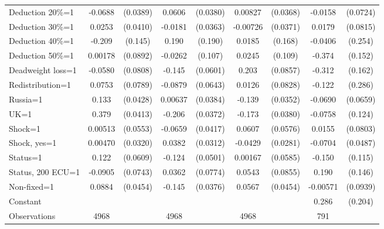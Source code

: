 \begin{tabular}{l|cccccc|cc}
Deduction 20\%=1&  -0.0688\sym{*}  & (0.0389)&   0.0606         & (0.0380)&  0.00827         & (0.0368)&  -0.0158         & (0.0724)\\
Deduction 30\%=1&   0.0253         & (0.0410)&  -0.0181         & (0.0363)& -0.00726         & (0.0371)&   0.0179         & (0.0815)\\
Deduction 40\%=1&   -0.209         &  (0.145)&    0.190         &  (0.190)&   0.0185         &  (0.168)&  -0.0406         &  (0.254)\\
Deduction 50\%=1&  0.00178         & (0.0892)&  -0.0262         &  (0.107)&   0.0245         &  (0.109)&   -0.374\sym{**} &  (0.152)\\
Deadweight loss=1&  -0.0580         & (0.0808)&   -0.145\sym{**} & (0.0601)&    0.203\sym{**} & (0.0857)&   -0.312\sym{*}  &  (0.162)\\
Redistribution=1&   0.0753         & (0.0789)&  -0.0879         & (0.0643)&   0.0126         & (0.0828)&   -0.122         &  (0.286)\\
Russia=1        &    0.133\sym{***}& (0.0428)&  0.00637         & (0.0384)&   -0.139\sym{***}& (0.0352)&  -0.0690         & (0.0659)\\
UK=1            &    0.379\sym{***}& (0.0413)&   -0.206\sym{***}& (0.0372)&   -0.173\sym{***}& (0.0380)&  -0.0758         &  (0.124)\\
Shock=1         &  0.00513         & (0.0553)&  -0.0659         & (0.0417)&   0.0607         & (0.0576)&   0.0155         & (0.0803)\\
Shock, yes=1    &  0.00470         & (0.0320)&   0.0382         & (0.0312)&  -0.0429         & (0.0281)&  -0.0704         & (0.0487)\\
Status=1        &    0.122\sym{**} & (0.0609)&   -0.124\sym{**} & (0.0501)&  0.00167         & (0.0585)&   -0.150         &  (0.115)\\
Status, 200 ECU=1&  -0.0905         & (0.0743)&   0.0362         & (0.0774)&   0.0543         & (0.0855)&    0.190         &  (0.146)\\
Non-fixed=1     &   0.0884\sym{*}  & (0.0454)&   -0.145\sym{***}& (0.0376)&   0.0567         & (0.0454)& -0.00571         & (0.0939)\\
Constant        &                  &         &                  &         &                  &         &    0.286         &  (0.204)\\
\hline
Observations    &     4968         &         &     4968         &         &     4968         &         &      791         &         \\


\end{tabular}
